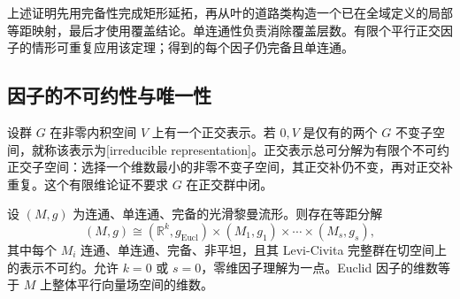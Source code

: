 上述证明先用完备性完成矩形延拓，再从叶的道路类构造一个已在全域定义的局部等距映射，最后才使用覆盖结论。单连通性负责消除覆盖层数。有限个平行正交因子的情形可重复应用该定理；得到的每个因子仍完备且单连通。

\subsection{因子的不可约性与唯一性}
\label{g3:subsec:0503:03}

设群 \(G\) 在非零内积空间 \(V\) 上有一个正交表示。若 \(0,V\) 是仅有的两个 \(G\) 不变子空间，就称该表示为[irreducible representation]。正交表示总可分解为有限个不可约正交子空间：选择一个维数最小的非零不变子空间，其正交补仍不变，再对正交补重复。这个有限维论证不要求 \(G\) 在正交群中闭。

\begin{theorem}\label{g3:thm:de-rham-decomposition}
	设 \((M,g)\) 为连通、单连通、完备的光滑黎曼流形。则存在等距分解
	\begin{equation}\label{g3:eq:de-rham-product}
		(M,g)\cong
		(\mathbb R^k,g_{\mathrm{Eucl}})
		\times(M_1,g_1)\times\cdots\times(M_s,g_s),
	\end{equation}
	其中每个 \(M_i\) 连通、单连通、完备、非平坦，且其 Levi-Civita 完整群在切空间上的表示不可约。允许 \(k=0\) 或 \(s=0\)，零维因子理解为一点。Euclid 因子的维数等于 \(M\) 上整体平行向量场空间的维数。
\end{theorem}
